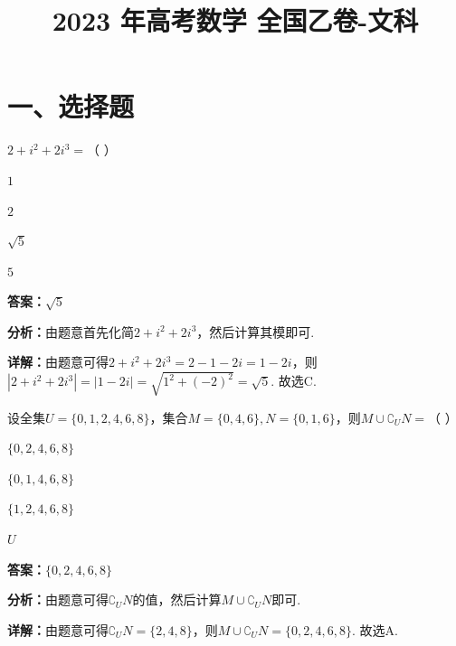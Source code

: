 ﻿\title{2023 年高考数学 全国乙卷-文科}
\date{}
\maketitle

\section*{一、选择题}

\begin{question}[points=5]
$2 + i^2 + 2i^3 =$（   ）
\begin{choices}
  \item $1$
  \item $2$
  \item $\sqrt{5}$
  \item $5$
\end{choices}
\begin{solution}
\textbf{答案：}$\sqrt{5}$

\textbf{分析：}由题意首先化简$2+i^2+2i^3$，然后计算其模即可.

\textbf{详解：}由题意可得$2+i^2+2i^3 = 2-1-2i = 1-2i$，则$|2+i^2+2i^3| = |1-2i| = \sqrt{1^2+(-2)^2} = \sqrt{5}$. 故选C.
\end{solution}
\end{question}

\begin{question}[points=5]
设全集$U=\{0,1,2,4,6,8\}$，集合$M=\{0,4,6\}, N=\{0,1,6\}$，则$M\cup \complement_U N =$（   ）
\begin{choices}
  \item $\{0,2,4,6,8\}$
  \item $\{0,1,4,6,8\}$
  \item $\{1,2,4,6,8\}$
  \item $U$
\end{choices}
\begin{solution}
\textbf{答案：}$\{0,2,4,6,8\}$

\textbf{分析：}由题意可得$\complement_U N$的值，然后计算$M\cup \complement_U N$即可.

\textbf{详解：}由题意可得$\complement_U N = \{2,4,8\}$，则$M\cup \complement_U N = \{0,2,4,6,8\}$. 故选A.
\end{solution}
\end{question}

